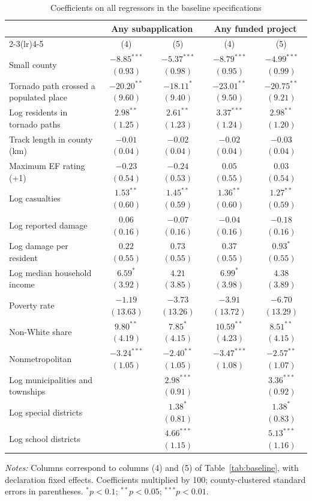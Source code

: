 \begin{table}[!htbp]
\centering
\footnotesize
\begin{threeparttable}
\caption{Coefficients on all regressors in the baseline specifications}
\label{tab:controls}
\setlength{\tabcolsep}{3.5pt}
\begin{tabular}{@{}lcccc@{}}
\toprule
 & \multicolumn{2}{c}{Any subapplication} & \multicolumn{2}{c}{Any funded project} \\
\cmidrule(lr){2-3}\cmidrule(lr){4-5}
 & (4) & (5) & (4) & (5) \\
\midrule
Small county & $-8.85^{***}$ $(0.93)$ & $-5.37^{***}$ $(0.98)$ & $-8.79^{***}$ $(0.95)$ & $-4.99^{***}$ $(0.99)$ \\
Tornado path crossed a populated place & $-20.20^{**}$ $(9.60)$ & $-18.11^{*}$ $(9.40)$ & $-23.01^{**}$ $(9.50)$ & $-20.75^{**}$ $(9.21)$ \\
Log residents in tornado paths & $2.98^{**}$ $(1.25)$ & $2.61^{**}$ $(1.23)$ & $3.37^{***}$ $(1.24)$ & $2.98^{**}$ $(1.20)$ \\
Track length in county (km) & $-0.01$ $(0.04)$ & $-0.02$ $(0.04)$ & $-0.02$ $(0.04)$ & $-0.03$ $(0.04)$ \\
Maximum EF rating (+1) & $-0.23$ $(0.54)$ & $-0.24$ $(0.53)$ & $0.05$ $(0.55)$ & $0.03$ $(0.54)$ \\
Log casualties & $1.53^{**}$ $(0.60)$ & $1.45^{**}$ $(0.59)$ & $1.36^{**}$ $(0.60)$ & $1.27^{**}$ $(0.59)$ \\
Log reported damage & $0.06$ $(0.16)$ & $-0.07$ $(0.16)$ & $-0.04$ $(0.16)$ & $-0.18$ $(0.16)$ \\
Log damage per resident & $0.22$ $(0.55)$ & $0.73$ $(0.55)$ & $0.37$ $(0.55)$ & $0.93^{*}$ $(0.55)$ \\
Log median household income & $6.59^{*}$ $(3.92)$ & $4.21$ $(3.85)$ & $6.99^{*}$ $(3.98)$ & $4.38$ $(3.89)$ \\
Poverty rate & $-1.19$ $(13.63)$ & $-3.73$ $(13.26)$ & $-3.91$ $(13.72)$ & $-6.70$ $(13.29)$ \\
Non-White share & $9.80^{**}$ $(4.19)$ & $7.85^{*}$ $(4.15)$ & $10.59^{**}$ $(4.23)$ & $8.51^{**}$ $(4.15)$ \\
Nonmetropolitan & $-3.24^{***}$ $(1.05)$ & $-2.40^{**}$ $(1.05)$ & $-3.47^{***}$ $(1.08)$ & $-2.57^{**}$ $(1.07)$ \\
Log municipalities and townships &  & $2.98^{***}$ $(0.91)$ &  & $3.36^{***}$ $(0.92)$ \\
Log special districts &  & $1.38^{*}$ $(0.81)$ &  & $1.38^{*}$ $(0.83)$ \\
Log school districts &  & $4.66^{***}$ $(1.15)$ &  & $5.13^{***}$ $(1.16)$ \\
\bottomrule
\end{tabular}
\begin{tablenotes}[flushleft]
\footnotesize
\item \textit{Notes:} Columns correspond to columns (4) and (5) of Table~\ref{tab:baseline}, with declaration fixed effects. Coefficients multiplied by 100; county-clustered standard errors in parentheses. $^{*}p<0.1$; $^{**}p<0.05$; $^{***}p<0.01$.
\end{tablenotes}
\end{threeparttable}
\end{table}
